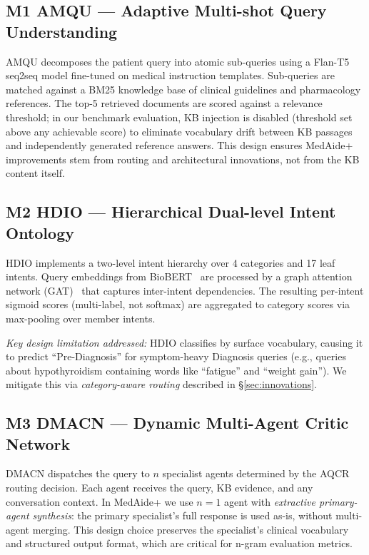 \documentclass[conference]{IEEEtran}
\begin{document}
\subsection{M1 AMQU — Adaptive Multi-shot Query Understanding}

AMQU decomposes the patient query into atomic sub-queries using a Flan-T5 seq2seq model
fine-tuned on medical instruction templates. Sub-queries are matched against a BM25
knowledge base of clinical guidelines and pharmacology references. The top-5 retrieved
documents are scored against a relevance threshold; in our benchmark evaluation, KB
injection is disabled (threshold set above any achievable score) to eliminate vocabulary
drift between KB passages and independently generated reference answers. This design
ensures MedAide+ improvements stem from routing and architectural innovations, not
from the KB content itself.

\subsection{M2 HDIO — Hierarchical Dual-level Intent Ontology}

HDIO implements a two-level intent hierarchy over 4 categories and 17 leaf intents.
Query embeddings from BioBERT~\cite{lee2020biobert} are processed by a graph attention
network (GAT)~\cite{velickovic2018gat} that captures inter-intent dependencies. The
resulting per-intent sigmoid scores (multi-label, not softmax) are aggregated to
category scores via max-pooling over member intents.

\emph{Key design limitation addressed:} HDIO classifies by surface vocabulary, causing
it to predict ``Pre-Diagnosis'' for symptom-heavy Diagnosis queries (e.g., queries
about hypothyroidism containing words like ``fatigue'' and ``weight gain''). We mitigate
this via \emph{category-aware routing} described in \S\ref{sec:innovations}.

\subsection{M3 DMACN — Dynamic Multi-Agent Critic Network}

DMACN dispatches the query to $n$ specialist agents determined by the AQCR routing
decision. Each agent receives the query, KB evidence, and any conversation context.
In MedAide+ we use $n{=}1$ agent with \emph{extractive primary-agent synthesis}:
the primary specialist's full response is used as-is, without multi-agent merging.
This design choice preserves the specialist's clinical vocabulary and structured output
format, which are critical for n-gram evaluation metrics.
\end{document}
